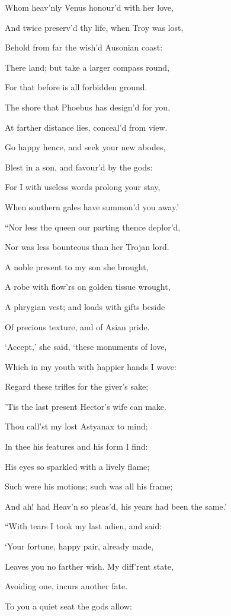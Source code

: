 Whom heav’nly Venus honour’d with her love,

And twice preserv’d thy life, when Troy was lost,

Behold from far the wish’d Ausonian coast:

There land; but take a larger compass round,

For that before is all forbidden ground.

The shore that Phoebus has design’d for you,

At farther distance lies, conceal’d from view.

Go happy hence, and seek your new abodes,

Blest in a son, and favour’d by the gods:

For I with useless words prolong your stay,

When southern gales have summon’d you away.’

“Nor less the queen our parting thence deplor’d,

Nor was less bounteous than her Trojan lord.

A noble present to my son she brought,

A robe with flow’rs on golden tissue wrought,

A phrygian vest; and loads with gifts beside

Of precious texture, and of Asian pride.

‘Accept,’ she said, ‘these monuments of love,

Which in my youth with happier hands I wove:

Regard these trifles for the giver’s sake;

’Tis the last present Hector’s wife can make.

Thou call’st my lost Astyanax to mind;

In thee his features and his form I find:

His eyes so sparkled with a lively flame;

Such were his motions; such was all his frame;

And ah! had Heav’n so pleas’d, his years had been the same.’

“With tears I took my last adieu, and said:

‘Your fortune, happy pair, already made,

Leaves you no farther wish. My diff’rent state,

Avoiding one, incurs another fate.

To you a quiet seat the gods allow:

